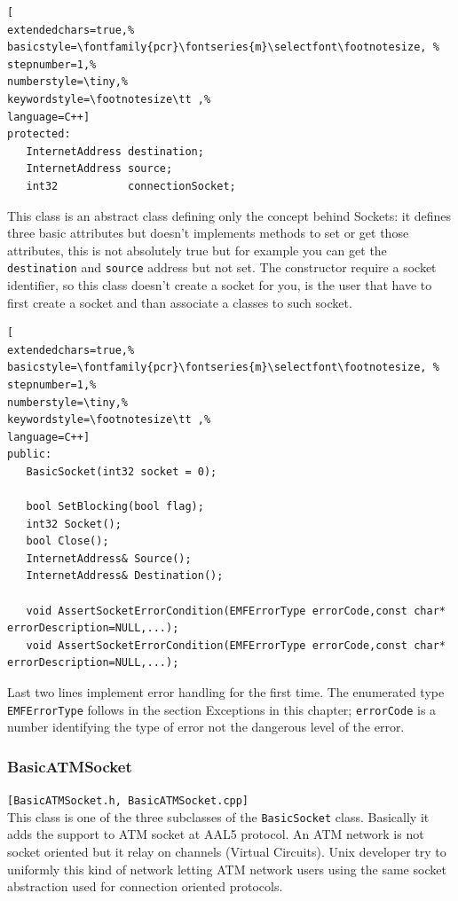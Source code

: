 \begin{lstlisting}[
extendedchars=true,%
basicstyle=\fontfamily{pcr}\fontseries{m}\selectfont\footnotesize, %
stepnumber=1,%
numberstyle=\tiny,%
keywordstyle=\footnotesize\tt ,%
language=C++]
protected:
   InternetAddress destination;
   InternetAddress source;
   int32           connectionSocket;
\end{lstlisting}

This class is an abstract class defining only the concept behind Sockets: it defines three basic attributes but doesn't implements methods to set or get those attributes, this is not absolutely true but for example you can get the \texttt{destination} and \texttt{source} address but not set. The constructor require a socket identifier, so this class doesn't create a socket for you, is the user that have to first create a socket and than associate a classes to such socket.

\begin{lstlisting}[
extendedchars=true,%
basicstyle=\fontfamily{pcr}\fontseries{m}\selectfont\footnotesize, %
stepnumber=1,%
numberstyle=\tiny,%
keywordstyle=\footnotesize\tt ,%
language=C++]
public:
   BasicSocket(int32 socket = 0);

   bool SetBlocking(bool flag);
   int32 Socket();
   bool Close();
   InternetAddress& Source();
   InternetAddress& Destination();

   void AssertSocketErrorCondition(EMFErrorType errorCode,const char* errorDescription=NULL,...);
   void AssertSocketErrorCondition(EMFErrorType errorCode,const char* errorDescription=NULL,...);
\end{lstlisting}

Last two lines implement error handling for the first time. The enumerated type \texttt{EMFErrorType} follows in the section Exceptions in this chapter; \texttt{errorCode} is a number identifying the type of error not the dangerous level of the error.



\subsubsection{BasicATMSocket}
\texttt{[BasicATMSocket.h, BasicATMSocket.cpp]}\\
This class is one of the three subclasses of the \texttt{BasicSocket} class. Basically it adds the support to ATM socket at AAL5 protocol. An ATM network is not socket oriented but it relay on channels (Virtual Circuits). Unix developer try to uniformly this kind of network letting ATM network users using the same socket abstraction used for connection oriented protocols.

